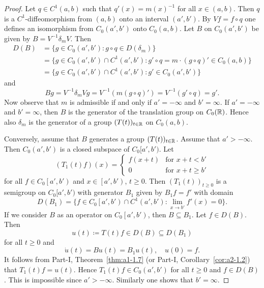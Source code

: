 \begin{proof}
Let $q \in C^{1}(a,b)$ such that $q'(x) = m(x)^{-1}$ for all $x \in (a,b)$.
Then $q$ is a $C^{1}$-diffeomorphism from $(a,b)$ onto an interval $(a',b')$.
By $Vf = f \circ q$ one defines an isomorphism from $C_{0}(a',b')$ onto $C_{0}(a,b)$.
Let $B$ on $C_{0}(a',b')$ be given by $B = V^{-1}\delta_{m}V$.
Then 
\begin{align*}
D(B) &= \{ g \in C_{0}(a',b') \colon g \circ q \in D(\delta_{m}) \} \\
&= \{ g \in C_{0}(a',b') \cap C^{1}(a',b') \colon g' \circ q 
= m \cdot (g \circ q)' \in C_{0}(a,b) \} \\
&= \{ g \in C_{0}(a',b') \cap C^{1}(a',b') \colon g' \in C_{0}(a',b') \}
\end{align*}
and 
%
\[
	Bg = V^{-1}\delta_{m}Vg = V^{-1}(m(g \circ q)') = V^{-1}(g' \circ q) = g'.
\]
%
Now observe that $m$ is admissible if and only if\/ $a' = -\infty$ and $b' = \infty$.
If\/ $a' = -\infty$ and $b' = \infty$, then $B$ is the generator of the translation group on $C_{0}(\mathbb{R})$.
Hence also $\delta_{m}$ is the generator of a group $(T(t))_{t \in \mathbb{R}}$ on $C_{0}(a,b)$.

Conversely, assume that $B$ generates a group $(T(t))_{t \in \mathbb{R}}$.
Assume that $a' > -\infty$.
Then $C_{0}(a',b')$ is a closed subspace of\/ $C_{0}[a',b')$.
Let
\begin{equation*}\label{eq:b2-t1}
(T_{1}(t)f)(x) = \begin{cases}
    f(x+t) & \text{for } x+t < b' \\
    0 & \text{for } x+t \geq b'
\end{cases}
\end{equation*}
for all $f \in C_{0}\left[a',b'\right)$ and $x \in \left[a',b'\right)$, $t \geq 0$.
Then $(T_{1}(t))_{t \geq 0}$ is a semigroup on $C_{0}[a',b')$ with generator $B_{1}$ given by 
$B_{1}f = f'$ with domain 
\[
D(B_{1}) = \{ f \in C_{0}\left[a',b'\right) \cap C^{1}(a',b') \colon \lim_{x \to b'} f'(x) = 0 \}.
\]
If we consider $B$ as an operator on $C_{0}\left[a',b'\right)$, then $B \subseteq B_{1}$.
Let $f \in D(B)$.
Then 
%
\[
	 u(t) \coloneq T(t)f \in D(B) \subseteq D(B_{1}) 
\]
%
for all $t \geq 0$ and 
%
\[
	\dot{u}(t) = Bu(t) = B_{1}u(t), \quad u(0) = f.
\]
%
It follows from Part-I, Theorem~\ref{thm:a1-1.7} (or Part-I, Corollary~\ref{cor:a2-1.2})
that $T_{1}(t)f = u(t)$.
Hence $T_{1}(t)f \in C_{0}(a',b')$ for all $t \geq 0$ and $f \in D(B)$.
This is impossible since $a' > -\infty$.
Similarly one shows that $b' = \infty$.
\end{proof}
